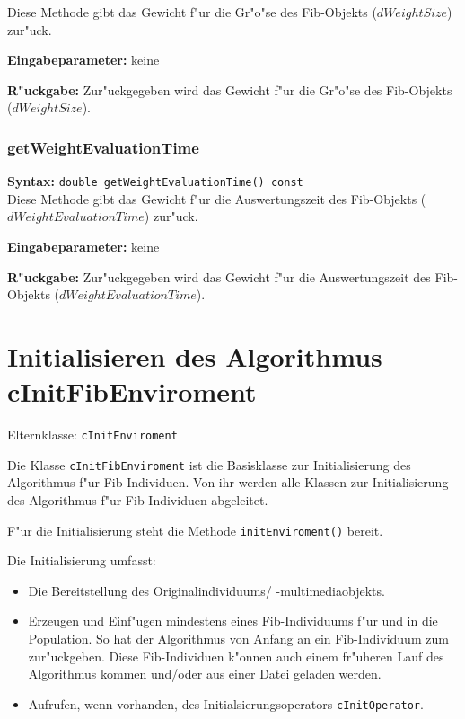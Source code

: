 Diese Methode gibt das Gewicht f"ur die Gr"o"se des Fib-Objekts ($dWeightSize$) zur"uck.

\bigskip\noindent
\textbf{Eingabeparameter:} keine

\bigskip\noindent
\textbf{R"uckgabe:} Zur"uckgegeben wird das Gewicht f"ur die Gr"o"se des Fib-Objekts ($dWeightSize$).


\subsubsection{getWeightEvaluationTime}

\textbf{Syntax:} \verb|double getWeightEvaluationTime() const| \\

Diese Methode gibt das Gewicht f"ur die Auswertungszeit des Fib-Objekts ($dWeightEvaluationTime$) zur"uck.

\bigskip\noindent
\textbf{Eingabeparameter:} keine

\bigskip\noindent
\textbf{R"uckgabe:} Zur"uckgegeben wird das Gewicht f"ur die Auswertungszeit des Fib-Objekts ($dWeightEvaluationTime$).



\section{Initialisieren des Algorithmus cInitFibEnviroment}
\label{secInitFibAlgoritmus}

Elternklasse: \verb|cInitEnviroment|

\bigskip\noindent
Die Klasse \verb|cInitFibEnviroment| ist die Basisklasse zur Initialisierung des Algorithmus f"ur Fib-Individuen. Von ihr werden alle Klassen zur Initialisierung des Algorithmus f"ur Fib-Individuen abgeleitet.

F"ur die Initialisierung steht die Methode \verb|initEnviroment()| bereit.

Die Initialisierung umfasst:
\begin{itemize}
 \item Die Bereitstellung des Originalindividuums/ -multimediaobjekts.
 \item Erzeugen und Einf"ugen mindestens eines Fib-Individuums f"ur und in die Population. So hat der Algorithmus von Anfang an ein Fib-Individuum zum zur"uckgeben. Diese Fib-Individuen k"onnen auch einem fr"uheren Lauf des Algorithmus kommen und/oder aus einer Datei geladen werden.
 \item Aufrufen, wenn vorhanden, des Initialsierungsoperators \verb|cInitOperator|.
\end{itemize}


